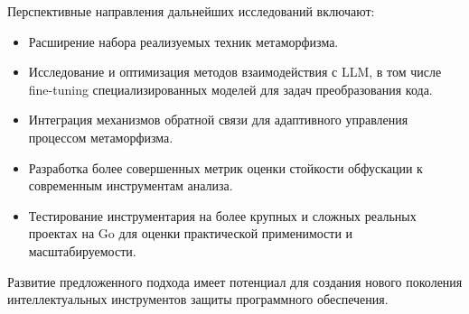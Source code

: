 Перспективные направления дальнейших исследований включают:
\begin{itemize}
    \item Расширение набора реализуемых техник метаморфизма.
    \item Исследование и оптимизация методов взаимодействия с LLM, в том числе fine-tuning специализированных моделей для задач преобразования кода.
    \item Интеграция механизмов обратной связи для адаптивного управления процессом метаморфизма.
    \item Разработка более совершенных метрик оценки стойкости обфускации к современным инструментам анализа.
    \item Тестирование инструментария на более крупных и сложных реальных проектах на Go для оценки практической применимости и масштабируемости.
\end{itemize}
Развитие предложенного подхода имеет потенциал для создания нового поколения интеллектуальных инструментов защиты программного обеспечения.
